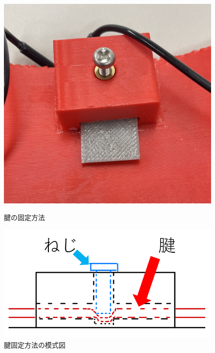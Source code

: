 \documentclass{jarticle}
\begin{document}
\begin{figure}[t]
  \begin{minipage}[b]{0.47\columnwidth}
    \centering
    \includegraphics[scale=0.15]{image/kenkotei.jpg}
    \vspace{-2mm}
    \caption{腱の固定方法}
    \label{fig:kenkotei}
  \end{minipage}
  \hspace{0.04\columnwidth}
  \begin{minipage}[b]{0.47\columnwidth}
    \centering
    \includegraphics[scale=0.15]{image/moshiki_edited.png}
    \vspace{1mm}
    \caption{腱固定方法の模式図}
    \label{fig:ken_moshiki}
  \end{minipage}
\end{figure}
\end{document}
